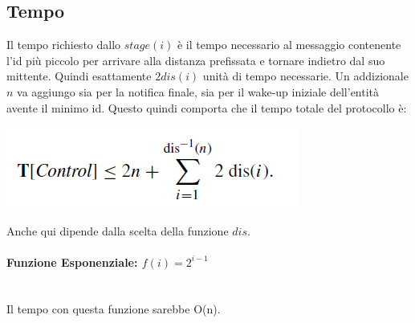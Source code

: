 \subsection{Tempo}
Il tempo richiesto dallo $stage(i)$ è il tempo necessario al messaggio
contenente l'id più piccolo per arrivare alla distanza prefissata e tornare
indietro dal suo mittente. Quindi esattamente $2dis(i)$ unità di tempo
necessarie. Un addizionale $n$ va aggiungo sia per la notifica finale, sia per
il wake-up iniziale dell'entità avente il minimo id. Questo quindi comporta che
il tempo totale del protocollo è:
\begin{center}
    \includegraphics[scale=0.6]{aa/ee.png}
\end{center}
Anche qui dipende dalla scelta della funzione $dis$.

\paragraph{Funzione Esponenziale: $f(i) = 2^{i-1}$}\ \\
Il tempo con questa funzione sarebbe O(n).


